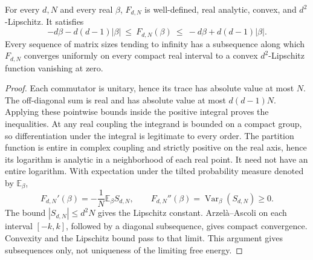 \begin{proposition}
For every \(d,N\) and every real \(\beta\), \(F_{d,N}\) is well-defined,
real analytic, convex, and \(d^2\)-Lipschitz. It satisfies
\[
 -d\beta-d(d-1)|\beta|\ \leq\ F_{d,N}(\beta)
 \ \leq\ -d\beta+d(d-1)|\beta|.
\]
Every sequence of matrix sizes tending to infinity has a subsequence along
which \(F_{d,N}\) converges uniformly on every compact real interval to a
convex \(d^2\)-Lipschitz function vanishing at zero.
\end{proposition}
\begin{proof}
Each commutator is unitary, hence its trace has absolute value at most \(N\).
The off-diagonal sum is real and has absolute value at most \(d(d-1)N\).
Applying these pointwise bounds inside the positive integral proves the
inequalities. At any real coupling the integrand is bounded on a compact
group, so differentiation under the integral is legitimate to every order.
The partition function is entire in complex coupling and strictly positive
on the real axis, hence its logarithm is analytic in a neighborhood of each
real point. It need not have an entire logarithm. With expectation under
the tilted probability measure denoted by \(\mathbb E_\beta\),
\[
 F_{d,N}'(\beta)=-\frac1N\mathbb E_\beta S_{d,N},\qquad
 F_{d,N}''(\beta)=\operatorname{Var}_\beta(S_{d,N})\geq0.
\]
The bound \(|S_{d,N}|\leq d^2N\) gives the Lipschitz constant.
Arzel\`a--Ascoli on each interval \([-k,k]\), followed by a diagonal
subsequence, gives compact convergence. Convexity and the Lipschitz bound
pass to that limit. This argument gives subsequences only, not uniqueness
of the limiting free energy.
\end{proof}

